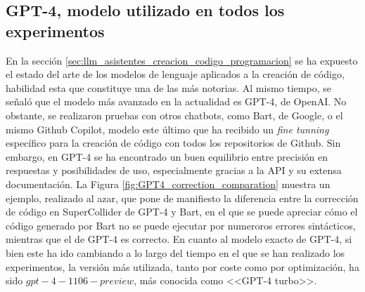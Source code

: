 \subsection{GPT-4, modelo utilizado en todos los experimentos}

En la sección \ref{sec:llm_asistentes_creacion_codigo_programacion} se ha expuesto el estado del arte de los modelos de lenguaje aplicados a la creación de código, habilidad esta que constituye una de las más notorias. Al mismo tiempo, se señaló que el modelo más avanzado en la actualidad es GPT-4, de OpenAI. No obstante, se realizaron pruebas con otros chatbots, como Bart, de Google, o el mismo Github Copilot, modelo este último que ha recibido un \textit{fine tunning} específico para la creación de código con todos los repositorios de Github. Sin embargo, en GPT-4 se ha encontrado un buen equilibrio entre precisión en respuestas y posibilidades de uso, especialmente gracias a la API y su extensa documentación. La Figura \ref{fig:GPT4_correction_comparation} muestra un ejemplo, realizado al azar, que pone de manifiesto la diferencia entre la corrección de código en SuperCollider de GPT-4 y Bart, en el que se puede apreciar cómo el código generado por Bart no se puede ejecutar por numeroros errores sintácticos, mientras que el de GPT-4 es correcto. En cuanto al modelo exacto de GPT-4, si bien este ha ido cambiando a lo largo del tiempo en el que se han realizado los experimentos, la versión más utilizada, tanto por coste como por optimización, ha sido $gpt-4-1106-preview$, más conocida como <<GPT-4 turbo>>.


